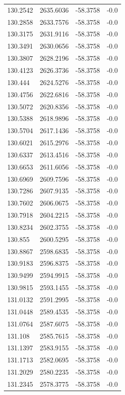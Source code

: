 \begin{table}[H]
\begin{tabular}{llll}
130.2542 & 2635.6036 & -58.3758 & -0.0 \\
130.2858 & 2633.7576 & -58.3758 & -0.0 \\
130.3175 & 2631.9116 & -58.3758 & -0.0 \\
130.3491 & 2630.0656 & -58.3758 & -0.0 \\
130.3807 & 2628.2196 & -58.3758 & -0.0 \\
130.4123 & 2626.3736 & -58.3758 & -0.0 \\
130.444 & 2624.5276 & -58.3758 & -0.0 \\
130.4756 & 2622.6816 & -58.3758 & -0.0 \\
130.5072 & 2620.8356 & -58.3758 & -0.0 \\
130.5388 & 2618.9896 & -58.3758 & -0.0 \\
130.5704 & 2617.1436 & -58.3758 & -0.0 \\
130.6021 & 2615.2976 & -58.3758 & -0.0 \\
130.6337 & 2613.4516 & -58.3758 & -0.0 \\
130.6653 & 2611.6056 & -58.3758 & -0.0 \\
130.6969 & 2609.7596 & -58.3758 & -0.0 \\
130.7286 & 2607.9135 & -58.3758 & -0.0 \\
130.7602 & 2606.0675 & -58.3758 & -0.0 \\
130.7918 & 2604.2215 & -58.3758 & -0.0 \\
130.8234 & 2602.3755 & -58.3758 & -0.0 \\
130.855 & 2600.5295 & -58.3758 & -0.0 \\
130.8867 & 2598.6835 & -58.3758 & -0.0 \\
130.9183 & 2596.8375 & -58.3758 & -0.0 \\
130.9499 & 2594.9915 & -58.3758 & -0.0 \\
130.9815 & 2593.1455 & -58.3758 & -0.0 \\
131.0132 & 2591.2995 & -58.3758 & -0.0 \\
131.0448 & 2589.4535 & -58.3758 & -0.0 \\
131.0764 & 2587.6075 & -58.3758 & -0.0 \\
131.108 & 2585.7615 & -58.3758 & -0.0 \\
131.1397 & 2583.9155 & -58.3758 & -0.0 \\
131.1713 & 2582.0695 & -58.3758 & -0.0 \\
131.2029 & 2580.2235 & -58.3758 & -0.0 \\
131.2345 & 2578.3775 & -58.3758 & -0.0 \\

\end{tabular}
\end{table}
